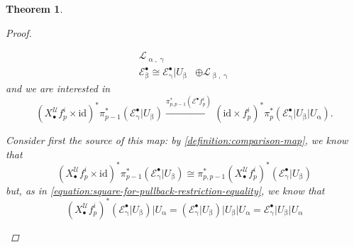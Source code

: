\documentclass[11pt,fleqn]{article}
\theoremstyle{plain}
\newtheorem{theorem}{Theorem}[subsection]
\theoremstyle{definition}
\theoremstyle{remark}
\numberwithin{equation}{theorem}
\newcommand{\cover}{\mathcal{U}}
\newcommand{\restricted}{\mathbin{\big\vert}}
\newcommand{\id}{\mathrm{id}}
\newcommand{\nerve}[1]{X_{#1}^\cover}
\begin{document}
\begin{theorem}
\begin{proof}
\begin{enumerate}
\begin{enumerate}[(i)]
\begin{equation*}
\begin{array}{lr}
                                        \mathcal{L}_{\upalpha,\upgamma}\\[0.3em]
                                        \mathcal{E}_\upbeta^\bullet
                                        \cong
                                        \mathcal{E}_\upgamma^\bullet \restricted U_\upbeta
                                        &\oplus
                                        \mathcal{L}_{\upbeta,\upgamma}
                                    \end{array}
                                \end{equation*}
                                and we are interested in
                                \begin{equation*}
                                    \left(\nerve{\bullet}f_p^i\times\id\right)^* \pi_{p-1}^* \left(\mathcal{E}_\upgamma^\bullet \restricted U_\upbeta\right)
                                    \xrightarrow{\pi_{p,p-1}^*\left(\mathcal{E}^\bullet f_p^i\right)}
                                    \left(\id\times f_p^i\right)^* \pi_p^* \left(\mathcal{E}_\upgamma^\bullet \restricted U_\upbeta \restricted U_\upalpha\right).
                                \end{equation*}

                                Consider first the source of this map: by \cref{definition:comparison-map}, we know that
                                \begin{equation*}
                                    \left(\nerve{\bullet}f_p^i\times\id\right)^* \pi_{p-1}^* \left(\mathcal{E}_\upgamma^\bullet \restricted U_\upbeta\right)
                                    \cong
                                    \pi_{p,p-1}^* \left(\nerve{\bullet}f_p^i\right)^* \left(\mathcal{E}_\upgamma^\bullet \restricted U_\upbeta\right)
                                \end{equation*}
                                but, as in \cref{equation:square-for-pullback-restriction-equality}, we know that
                                \begin{equation*}
                                    \left(\nerve{\bullet}f_p^i\right)^* \left(\mathcal{E}_\upgamma^\bullet \restricted U_\upbeta\right) \restricted U_\upalpha
                                    =
                                    \left(\mathcal{E}_\upgamma^\bullet \restricted U_\upbeta\right) \restricted U_\upbeta \restricted U_\upalpha
                                    =
                                    \mathcal{E}_\upgamma^\bullet \restricted U_\upbeta \restricted U_\upalpha
                                \end{equation*}


\end{enumerate}
\end{enumerate}
\end{proof}
\end{theorem}
\end{document}
